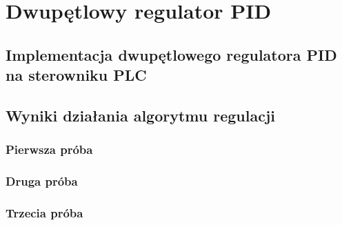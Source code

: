 \chapter{Dwupętlowy regulator PID}
\label{thermal_pid}

\section{Implementacja dwupętlowego regulatora PID na sterowniku PLC}
\label{thermal_pid_impl}

\section{Wyniki działania algorytmu regulacji}
\label{thermal_pid_wyniki}

\subsection{Pierwsza próba}
\label{thermal_pid_proba_1}

\subsection{Druga próba}
\label{thermal_pid_proba_2}

\subsection{Trzecia próba}
\label{thermal_pid_proba_3}